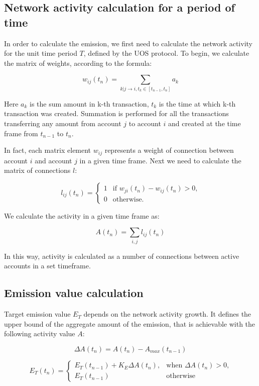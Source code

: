 \documentclass[a4paper,12pt]{article}
\begin{document}
\subsection{Network activity calculation for a period of time}

In order to calculate the emission, we first need to calculate the network activity for the unit time period $T$, defined by the U{\degree}OS protocol. To begin, we calculate the matrix of weights, according to the formula:



$$
w_{ij}(t_n)=\sum_{k|j \to i, t_k \in [t_{n-1}, t_n]}a_k
$$

Here $a_k$  is the sum amount in k-th transaction, $t_k$ is the time at which k-th transaction was created. Summation is performed for all the transactions transferring any amount from account $j$ to account $i$ and created at the time frame from $t_{n-1}$ to $t_n$. 

In fact, each matrix element $w_{ij}$ represents a weight of connection between account $i$ and account $j$ in a given time frame. Next we need to calculate the matrix of connections $l$: 



$$
l_{ij}(t_n) = \begin{cases}
 1
 & \text{if $w_{ji}(t_n)-w_{ij}(t_n) > 0$,}\\
 0 & \text{otherwise.}
\end{cases}
$$

We calculate the activity in a given time frame as:



$$
A(t_n) = \sum_{i,j} l_{ij}(t_n)
$$

In this way, activity is calculated as a number of connections between active accounts in a set timeframe. 



\subsection{Emission value calculation}

Target emission value $E_T$ depends on the network activity growth. It defines the upper bound of the aggregate amount of the emission, that is achievable with the following activity value $A$:



$$
\Delta A(t_n) = A(t_n) - A_{max}(t_{n-1})
$$

$$
E_T(t_n) = \begin{cases}
 E_T(t_{n-1}) + K_E \Delta A(t_n),
 & \text{when $\Delta A(t_n) > 0$,}\\
 E_T(t_{n-1}) & \text{otherwise}
\end{cases}
$$
\end{document}
